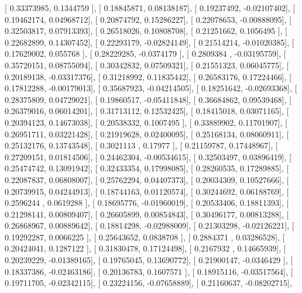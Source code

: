 \documentclass{article}
\begin{document}
       [ 0.33373985,  0.1344759 ],
       [ 0.18845871,  0.08138187],
       [ 0.19237492, -0.02107402],
       [ 0.19462174,  0.04968712],
       [ 0.20874792,  0.15286227],
       [ 0.22078653, -0.00888095],
       [ 0.32503817,  0.07913393],
       [ 0.26518026,  0.10808708],
       [ 0.21251662,  0.1056495 ],
       [ 0.22682899,  0.14307452],
       [ 0.22293179, -0.02824149],
       [ 0.21514214, -0.01020385],
       [ 0.17629002,  0.055768  ],
       [ 0.28229285, -0.0374179 ],
       [ 0.2809384 , -0.03195759],
       [ 0.35720151,  0.08755094],
       [ 0.30342832,  0.07509321],
       [ 0.21551323,  0.06045775],
       [ 0.20189138, -0.03317376],
       [ 0.31218992,  0.11835442],
       [ 0.26583176,  0.17224466],
       [ 0.17812288, -0.00179013],
       [ 0.35687923, -0.04214505],
       [ 0.18251642, -0.02693368],
       [ 0.28375809,  0.04729021],
       [ 0.19860517, -0.05411848],
       [ 0.36684862,  0.09539468],
       [ 0.26379016,  0.06014201],
       [ 0.31713112,  0.12532425],
       [ 0.18415018,  0.03071165],
       [ 0.20394123,  0.14673038],
       [ 0.20538332,  0.1007495 ],
       [ 0.33889902,  0.11701907],
       [ 0.26951711,  0.03221428],
       [ 0.21919628,  0.02400095],
       [ 0.25168134,  0.08060911],
       [ 0.25132176,  0.13743548],
       [ 0.3021113 ,  0.17977   ],
       [ 0.21159787,  0.17448967],
       [ 0.27209151,  0.01814506],
       [ 0.24462304, -0.00534615],
       [ 0.32503497,  0.03896419],
       [ 0.25474742,  0.13091942],
       [ 0.32433354,  0.17998085],
       [ 0.28260535,  0.17289885],
       [ 0.22087837,  0.06808007],
       [ 0.25762294,  0.04407373],
       [ 0.20034309,  0.10527666],
       [ 0.20739915,  0.04244913],
       [ 0.18744163,  0.01120574],
       [ 0.30244692,  0.06188769],
       [ 0.2596244 ,  0.0619288 ],
       [ 0.18695776, -0.01960019],
       [ 0.20533406,  0.18811393],
       [ 0.21298141,  0.00809407],
       [ 0.26605899,  0.00854843],
       [ 0.30496177,  0.00813288],
       [ 0.26868967,  0.00889642],
       [ 0.18814298, -0.02988009],
       [ 0.21303298, -0.02126221],
       [ 0.19292287,  0.0066225 ],
       [ 0.25643652,  0.0838708 ],
       [ 0.2884371 ,  0.03286528],
       [ 0.20424041,  0.1287122 ],
       [ 0.31830478,  0.17124498],
       [ 0.2167932 ,  0.14665939],
       [ 0.20239229, -0.01389165],
       [ 0.19765045,  0.13690772],
       [ 0.21900147, -0.0346429 ],
       [ 0.18337386, -0.02463186],
       [ 0.20136783,  0.1607571 ],
       [ 0.18915116, -0.03517564],
       [ 0.19711705, -0.02342115],
       [ 0.23224156, -0.07658889],
       [ 0.21160637, -0.08202715],
\end{document}
